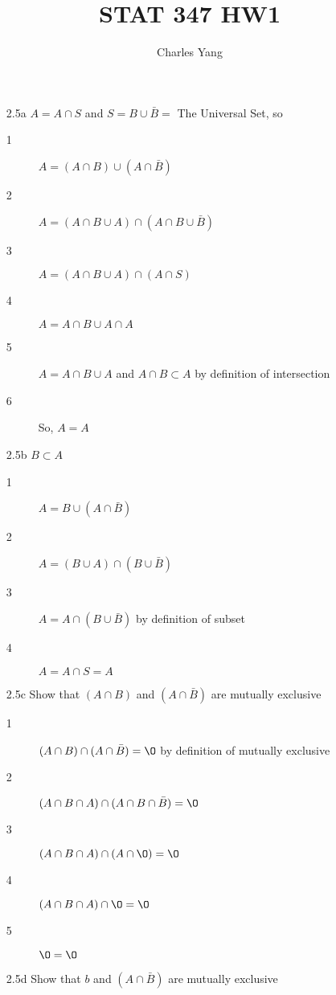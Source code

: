 \documentclass[11pt]{article}
\title{STAT 347 HW1}
\author{Charles Yang}
\begin{document}
    \maketitle

    \begin{enumerate}
        \item[2.5a] $A = A \cap S$ and $S = B \cup \bar{B} = $ The Universal Set, so
        \begin{description}
            \item[1] $A = (A \cap B) \cup (A \cap \bar{B})$
            \item[2] $A = (A \cap B \cup A) \cap (A \cap B \cup \bar{B})$
            \item[3] $A = (A \cap B \cup A) \cap (A \cap S)$
            \item[4] $A = A \cap B \cup A \cap A$
            \item[5] $A = A \cap B \cup A$ and $A \cap B \subset A$ by definition of intersection
            \item[6] So, $A = A$
        \end{description}
        \item[2.5b] $B \subset A$
        \begin{description}
            \item[1] $A = B \cup (A \cap \bar{B})$
            \item[2] $A = (B \cup A) \cap (B \cup \bar{B})$
            \item[3] $A = A \cap (B \cup \bar{B})$ by definition of subset
            \item[4] $A = A \cap S = A$
        \end{description}
        \item[2.5c] Show that $(A \cap B)$ and $(A \cap \bar{B})$ are mutually exclusive
        \begin{description}
            \item[1] $(A \cap B) \cap (A \cap \bar{B}) = \O$ by definition of mutually exclusive
            \item[2] $(A \cap B \cap A) \cap (A \cap B \cap \bar{B}) = \O$
            \item[3] $(A \cap B \cap A) \cap (A \cap \O) = \O$
            \item[4] $(A \cap B \cap A) \cap \O = \O$
            \item[5] $\O = \O$
        \end{description}
        \item[2.5d] Show that $b$ and $(A \cap \bar{B})$ are mutually exclusive

\end{enumerate}
\end{document}

